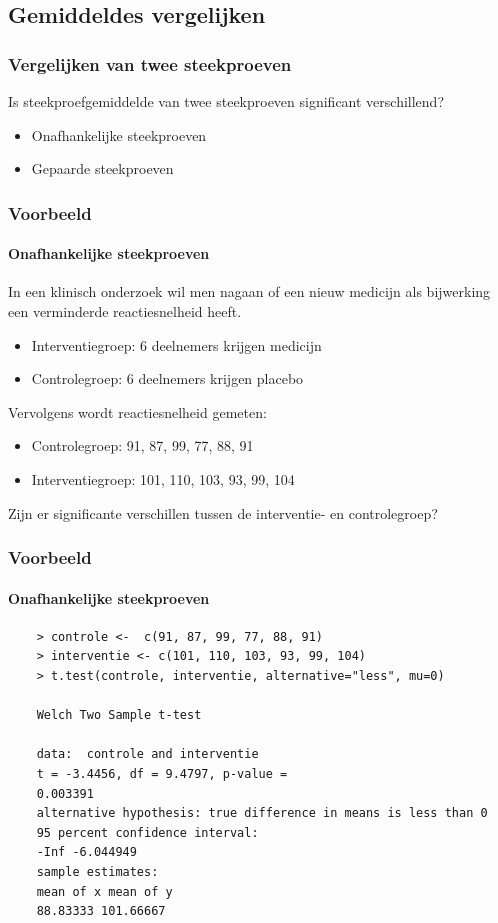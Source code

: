 \subsection{Gemiddeldes vergelijken}
\begin{frame}
	\frametitle{Vergelijken van twee steekproeven}
	
	Is steekproefgemiddelde van twee steekproeven significant verschillend?
	
	\begin{itemize}
		\item Onafhankelijke steekproeven
		\item Gepaarde steekproeven
	\end{itemize}
\end{frame}

\begin{frame}
	\frametitle{Voorbeeld}
	\framesubtitle{Onafhankelijke steekproeven}
	
	In een klinisch onderzoek wil men nagaan of een nieuw medicijn als bijwerking een verminderde reactiesnelheid heeft.
	
	\begin{itemize}
		\item Interventiegroep: 6 deelnemers krijgen medicijn
		\item Controlegroep: 6 deelnemers krijgen placebo
	\end{itemize}
	
	Vervolgens wordt reactiesnelheid gemeten:
	
	\begin{itemize}
		\item Controlegroep: 91, 87, 99, 77, 88, 91
		\item Interventiegroep: 101, 110, 103, 93, 99, 104
	\end{itemize}
	
	Zijn er significante verschillen tussen de interventie- en controlegroep?
\end{frame}

\begin{frame}[fragile]
	\frametitle{Voorbeeld}
	\framesubtitle{Onafhankelijke steekproeven}
	
	\footnotesize
	\begin{verbatim}
	> controle <-  c(91, 87, 99, 77, 88, 91)
	> interventie <- c(101, 110, 103, 93, 99, 104)
	> t.test(controle, interventie, alternative="less", mu=0)
	
	Welch Two Sample t-test
	
	data:  controle and interventie
	t = -3.4456, df = 9.4797, p-value =
	0.003391
	alternative hypothesis: true difference in means is less than 0
	95 percent confidence interval:
	-Inf -6.044949
	sample estimates:
	mean of x mean of y 
	88.83333 101.66667
	\end{verbatim}
\end{frame}



